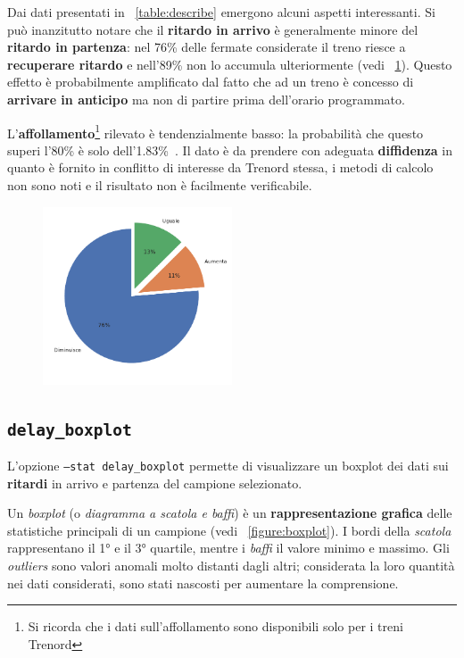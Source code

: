 \documentclass[12pt,a4paper,italian]{report}
\begin{document}
Dai dati presentati in \tablename~\ref{table:describe} emergono alcuni
aspetti interessanti.  Si può inanzitutto notare che il
\textbf{ritardo in arrivo} è generalmente minore del \textbf{ritardo
    in partenza}: nel 76\% delle fermate considerate il treno riesce a
\textbf{recuperare ritardo} e nell'89\% non lo accumula ulteriormente
(vedi \figurename~\ref{figure:delay_var}).  Questo effetto è
probabilmente amplificato dal fatto che ad un treno è concesso di
\textbf{arrivare in anticipo} ma non di partire prima dell'orario
programmato.

L'\textbf{affollamento}\footnote{Si ricorda che i dati
    sull'affollamento sono disponibili solo per i treni Trenord}
rilevato è tendenzialmente basso: la probabilità che questo superi
l'80\% è solo dell'1.83\%~\cite[B]{StatJup}.  Il dato è da prendere
con adeguata \textbf{diffidenza} in quanto è fornito in conflitto di
interesse da Trenord stessa, i metodi di calcolo non sono noti e il
risultato non è facilmente verificabile.

\begin{figure}[h] \centering
    \includegraphics[width=0.5\textwidth]{images/delay_var.pdf}
    \label{figure:delay_var}
\end{figure}

\subsection{\texttt{delay\_boxplot}}
\label{stat_delay_boxplot}

L'opzione \texttt{--stat delay\_\-boxplot} permette di visualizzare
un boxplot dei dati sui \textbf{ritardi} in arrivo e partenza del
campione selezionato.

Un \textit{boxplot} (o \textit{diagramma a scatola e baffi}) è un
\textbf{rappresentazione grafica} delle statistiche principali di un
campione (vedi \figurename~\ref{figure:boxplot}).  I bordi della
\textit{scatola} rappresentano il 1° e il 3° quartile, mentre i
\textit{baffi} il valore minimo e massimo.  Gli \textit{outliers} sono
valori anomali molto distanti dagli altri; considerata la loro
quantità nei dati considerati, sono stati nascosti per aumentare la
comprensione.
\end{document}
